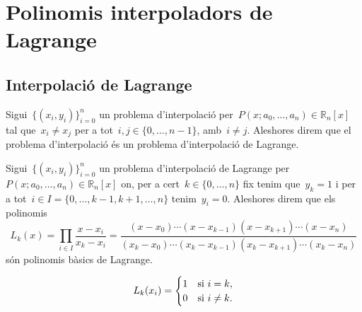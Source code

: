 \documentclass[../../main.tex]{subfiles}
\begin{document}
\section{Polinomis interpoladors de Lagrange}
    \subsection{Interpolació de Lagrange}
    \begin{definition}
        \label{def:problema d'interpolació de Lagrange}
        Sigui~\(\{(x_{i},y_{i})\}_{i=0}^{n}\) un problema d'interpolació per~\(P(x;a_{0},\dots,a_{n})\in\mathbb{R}_{n}[x]\) tal que~\(x_{i}\neq x_{j}\) per a tot~\(i,j\in\{0,\dots,n-1\}\), amb~\(i\neq j\).
        Aleshores direm que el problema d'interpolació és un problema d'interpolació de Lagrange.
    \end{definition}
    \begin{definition}
        \label{def:problema polinomis bàsics de Lagrange}
        Sigui~\(\{(x_{i},y_{i})\}_{i=0}^{n}\) un problema d'interpolació de Lagrange per~\(P(x;a_{0},\dots,a_{n})\in\mathbb{R}_{n}[x]\) on, per a cert~\(k\in\{0,\dots,n\}\) fix tenim que~\(y_{k}=1\) i per a tot~\(i\in I=\{0,\dots,k-1,k+1,\dots,n\}\) tenim~\(y_{i}=0\).
        Aleshores direm que els polinomis
        \[
            L_{k}(x)=\prod_{i\in I}\frac{x-x_{i}}{x_{k}-x_{i}}=\frac{(x-x_{0})\cdots(x-x_{k-1})(x-x_{k+1})\cdots(x-x_{n})}{(x_{k}-x_{0})\cdots(x_{k}-x_{k-1})(x_{k}-x_{k+1})\cdots(x_{k}-x_{n})}
        \]
        són polinomis bàsics de Lagrange.
    \end{definition}
    \begin{observation}\label{obs:polinomis bàsics de Lagrange cases}
        \[L_{k}(x_{i})=\begin{cases}
        1&\textup{si }i=k,\\
        0&\textup{si }i\neq k.
        \end{cases}\]
    \end{observation}
\end{document}
